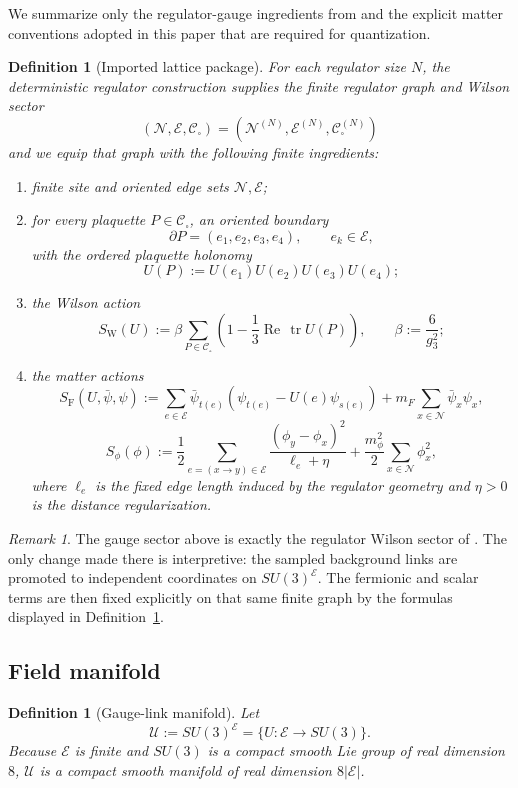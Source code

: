 \documentclass[11pt]{article}
\newtheorem{definition}[theorem]{Definition}
\theoremstyle{remark}
\newtheorem{remark}[theorem]{Remark}
\newcommand{\mcN}{\mathcal N}
\newcommand{\mcE}{\mathcal E}
\newcommand{\mcU}{\mathscr U}
\newcommand{\tr}{\operatorname{tr}}
\newcommand{\Ree}{\operatorname{Re}}
\begin{document}
We summarize only the regulator-gauge ingredients from \cite{continuumqft} and
the explicit matter conventions adopted in this paper that are required for
quantization.

\begin{definition}[Imported lattice package]
\label{def:imported-package}
For each regulator size \(N\), the deterministic regulator construction
supplies the finite regulator graph and Wilson sector
\[
(\mcN,\mcE,\mathcal C_\square)=
(\mcN^{(N)},\mcE^{(N)},\mathcal C_\square^{(N)})
\]
and we equip that graph with the following finite ingredients:
\begin{enumerate}[leftmargin=1.5em]
\item finite site and oriented edge sets $\mcN,\mcE$;
\item for every plaquette $P\in\mathcal C_\square$, an oriented boundary
\[
\partial P=(e_1,e_2,e_3,e_4),\qquad e_k\in\mcE,
\]
with the ordered plaquette holonomy
\[
U(P):=U(e_1)U(e_2)U(e_3)U(e_4);
\]
\item the Wilson action
\[
S_{\mathrm W}(U):=\beta\sum_{P\in\mathcal C_\square}
\left(1-\frac13\Ree\,\tr U(P)\right),
\qquad
\beta:=\frac{6}{g_3^2};
\]
\item the matter actions
\[
S_{\mathrm F}(U,\bar\psi,\psi)
:=
\sum_{e\in\mcE}\bar\psi_{t(e)}
\left(\psi_{t(e)}-U(e)\psi_{s(e)}\right)
+m_F\sum_{x\in\mcN}\bar\psi_x\psi_x,
\]
\[
S_\phi(\phi)
:=
\frac12\sum_{e=(x\to y)\in\mcE}\frac{(\phi_y-\phi_x)^2}{\ell_e+\eta}
+\frac{m_\phi^2}{2}\sum_{x\in\mcN}\phi_x^2,
\]
where $\ell_e$ is the fixed edge length induced by the regulator geometry and
$\eta>0$ is the distance regularization.
\end{enumerate}
\end{definition}

\begin{remark}
The gauge sector above is exactly the regulator Wilson sector of
\cite{continuumqft}.  The only change made there is interpretive: the sampled
background links are promoted to independent coordinates on $SU(3)^{\mcE}$.
The fermionic and scalar terms are then fixed explicitly on that same finite
graph by the formulas displayed in Definition~\ref{def:imported-package}.
\end{remark}

\subsection{Field manifold}

\begin{definition}[Gauge-link manifold]
\label{def:gauge-manifold}
Let
\[
\mcU:=SU(3)^{\mcE}
=\{U:\mcE\to SU(3)\}.
\]
Because $\mcE$ is finite and $SU(3)$ is a compact smooth Lie group of real
dimension $8$, $\mcU$ is a compact smooth manifold of real dimension
$8|\mcE|$.
\end{definition}
\end{document}
